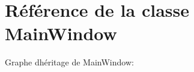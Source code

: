 \hypertarget{classMainWindow}{}\section{Référence de la classe Main\+Window}
\label{classMainWindow}


Graphe d\textquotesingle{}héritage de Main\+Window\+:
